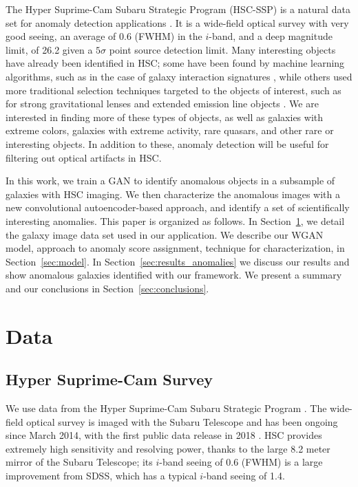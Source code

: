 The Hyper Suprime-Cam Subaru Strategic Program (HSC-SSP) is a natural data set for anomaly detection applications \citep{Miyazaki2018}.
It is a wide-field optical survey with very good seeing, an average of 0.6 (FWHM) in the $i$-band, and a deep magnitude limit, of 26.2 given a $5\sigma$ point source detection limit.
Many interesting objects have already been identified in HSC; some have been found by machine learning algorithms, such as in the case of galaxy interaction signatures \citep{Goulding2017}, while others used more traditional selection techniques targeted to the objects of interest, such as for strong gravitational lenses \citep{Wong2018} and extended emission line objects \citep{Sun2018}.
We are interested in finding more of these types of objects, as well as galaxies with extreme colors, galaxies with extreme activity, rare quasars, and other rare or interesting objects.
In addition to these, anomaly detection will be useful for filtering out optical artifacts in HSC.

In this work, we train a GAN to identify anomalous objects in a subsample of galaxies with HSC imaging.
We then characterize the anomalous images with a new convolutional autoencoder-based approach, and identify a set of scientifically interesting anomalies.
This paper is organized as follows.
In Section~\ref{sec:data_anomalies}, we detail the galaxy image data set used in our application.
We describe our WGAN model, approach to anomaly score assignment, technique for characterization,  in Section~\ref{sec:model}.
In Section~\ref{sec:results_anomalies} we discuss our results and show anomalous galaxies identified with our framework.
We present a summary and our conclusions in Section~\ref{sec:conclusions}.

\section{Data}
\label{sec:data_anomalies}

\subsection{Hyper Suprime-Cam Survey}

We use data from the Hyper Suprime-Cam Subaru Strategic Program \citep{Aihara2018a}.
The wide-field optical survey is imaged with the Subaru Telescope and has been ongoing since March 2014, with the first public data release in 2018 \citep{Aihara2018b}.
HSC provides extremely high sensitivity and resolving power, thanks to the large 8.2 meter mirror of the Subaru Telescope; its $i$-band seeing of 0.6 (FWHM) is a large improvement from SDSS, which has a typical $i$-band seeing of 1.4.

